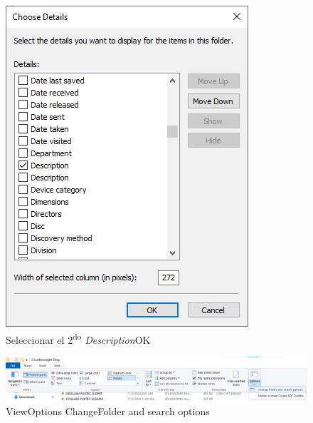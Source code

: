 \documentclass{report}
\begin{document}
\begin{figure}[H]
	\centering
	\includegraphics[width=0.65\linewidth, height=0.5\textheight,keepaspectratio]{Imagenes/fe_prop_desc_02}
	\caption{Seleccionar el 2\textsuperscript{do} \emph{Description}\textrightarrow OK}
	\label{fig:fepropdesc02}
\end{figure}

\begin{figure}[H]
	\centering
	\includegraphics[width=0.95\linewidth, height=0.5\textheight,keepaspectratio]{Imagenes/fe_prop_desc_03}
	\caption{View\textrightarrow Options Change\textrightarrow Folder and search options}
	\label{fig:fepropdesc03}
\end{figure}
\end{document}
